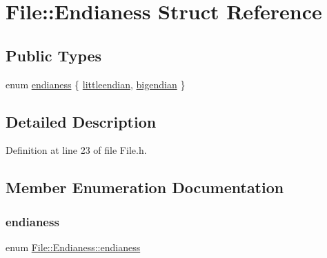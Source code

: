 \hypertarget{struct_file_1_1_endianess}{}\section{File\+:\+:Endianess Struct Reference}
\label{struct_file_1_1_endianess}
\subsection*{Public Types}
\begin{DoxyCompactItemize}
\item 
enum \hyperlink{struct_file_1_1_endianess_ac80818ac42fdd0c9aa29d424e65fa37e}{endianess} \{ \hyperlink{struct_file_1_1_endianess_ac80818ac42fdd0c9aa29d424e65fa37ea3cb0abec70bab3c0e492ef9b57d4f4da}{littleendian}, 
\hyperlink{struct_file_1_1_endianess_ac80818ac42fdd0c9aa29d424e65fa37ea7dcfb82e9bd382f1eab49a0d48993944}{bigendian}
 \}
\end{DoxyCompactItemize}


\subsection{Detailed Description}


Definition at line 23 of file File.\+h.



\subsection{Member Enumeration Documentation}
\mbox{\label{struct_file_1_1_endianess_ac80818ac42fdd0c9aa29d424e65fa37e}} 
\subsubsection{\texorpdfstring{endianess}{endianess}}
{\footnotesize\ttfamily enum \hyperlink{struct_file_1_1_endianess_ac80818ac42fdd0c9aa29d424e65fa37e}{File\+::\+Endianess\+::endianess}}

